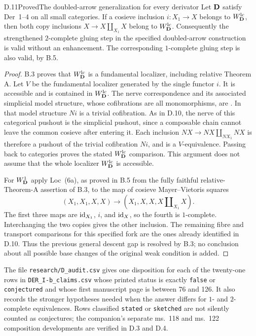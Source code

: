\begin{claim}{D.11}{Proved}{The doubled-arrow generalization for every derivator}
Let $\mathbf D$ satisfy Der~1--4 on all small categories. If a cosieve inclusion $i:X_1\to X$ belongs to $W^{\mathrm{lc}}_{\mathbf D}$, then both copy inclusions $X\to X\amalg_{X_1}X$ belong to $W^{\mathrm{lc}}_{\mathbf D}$. Consequently the strengthened $2$-complete gluing step in the specified doubled-arrow construction is valid without an enhancement. The corresponding $1$-complete gluing step is also valid, by B.5.
\end{claim}
\begin{proof}
B.3 proves that $W^{\mathrm{lc}}_{\mathbf D}$ is a fundamental localizer, including relative Theorem A. Let $V$ be the fundamental localizer generated by the single functor $i$. It is accessible and is contained in $W^{\mathrm{lc}}_{\mathbf D}$. The nerve correspondence and its associated simplicial model structure, whose cofibrations are all monomorphisms, are \citet[Theorems~1.4.3 and~4.2.15]{Cisinski2006}. In that model structure $Ni$ is a trivial cofibration. As in D.10, the nerve of this categorical pushout is the simplicial pushout, since a composable chain cannot leave the common cosieve after entering it. Each inclusion $NX\to NX\amalg_{NX_1}NX$ is therefore a pushout of the trivial cofibration $Ni$, and is a $V$-equivalence. Passing back to categories proves the stated $W^{\mathrm{lc}}_{\mathbf D}$ comparison. This argument does not assume that the whole localizer $W^{\mathrm{lc}}_{\mathbf D}$ is accessible.

For $W^1_{\mathbf D}$ apply Loc~(6a), as proved in B.5 from the fully faithful relative-Theorem-A assertion of B.3, to the map of cosieve Mayer--Vietoris squares
\[
 (X_1,X_1,X,X)\longrightarrow
 (X_1,X,X,X\amalg_{X_1}X).
\]
The first three maps are $\mathrm{id}_{X_1}$, $i$, and $\mathrm{id}_X$, so the fourth is $1$-complete. Interchanging the two copies gives the other inclusion. The remaining fibre and transport comparisons for this specified fork are the ones already identified in D.10. Thus the previous general descent gap is resolved by B.3; no conclusion about all possible base changes of the original weak condition is added.
\end{proof}

The file \texttt{research/D\_audit.csv} gives one disposition for each of the twenty-one rows in \texttt{DER\_I-b\_claims.csv} whose printed status is exactly \texttt{false} or \texttt{conjectured} and whose first manuscript page is between 76 and 126. It also records the stronger hypotheses needed when the answer differs for $1$- and $2$-complete equivalences. Rows classified \texttt{stated} or \texttt{sketched} are not silently counted as conjectures; the companion's separate ms.~118 and ms.~122 composition developments are verified in D.3 and D.4.

